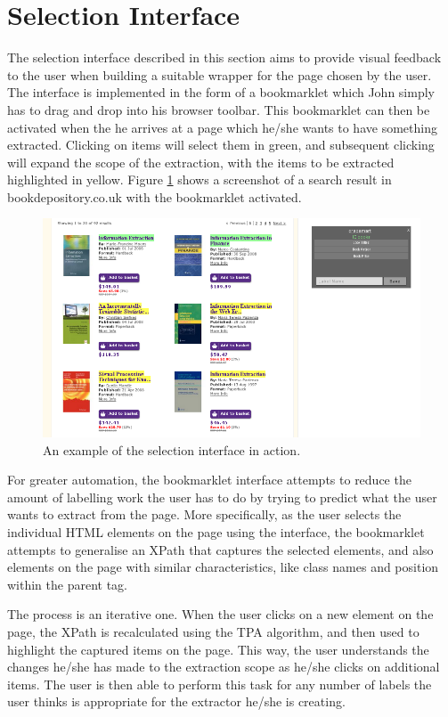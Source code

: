 \section{Selection Interface}
The selection interface described in this section aims to provide visual feedback to the user
when building a suitable wrapper for the page chosen by the user. The interface is implemented
in the form of a bookmarklet which John simply has to drag and drop into his browser
toolbar. This bookmarklet can then be activated when the he arrives at a page which he/she wants
to have something extracted. Clicking on items will select them in green, and subsequent clicking
will expand the scope of the extraction, with the items to be extracted highlighted in yellow.
Figure \ref{fig:selection_example} shows a screenshot of a search result in bookdepository.co.uk
with the bookmarklet activated.

\begin{figure}[htbp]
\centering
\includegraphics[scale=0.43]{selection_example.png} 
\caption{An example of the selection interface in action.}
\label{fig:selection_example}
\end{figure}


For greater automation, the bookmarklet interface attempts to reduce the amount of labelling
work the user has to do by trying to predict what the user wants to extract from the page.
More specifically, as the user selects the individual HTML elements on the page using the interface,
the bookmarklet attempts to generalise an XPath that captures the selected elements,
and also elements on the page with similar characteristics, like class names and position
within the parent tag.


The process is an iterative one. When the user clicks on a new element on the page,
the XPath is recalculated using the TPA algorithm, and then used to highlight the captured items on the page.
This way, the user understands the changes he/she has made to the extraction scope as he/she
clicks on additional items. The user is then able to perform this task for any number of labels
the user thinks is appropriate for the extractor he/she is creating.

